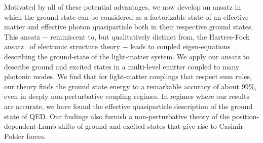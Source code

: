 \documentclass[aps,prl,twocolumn,
	groupedaddress,superscriptaddress,
	amsfonts,amssymb,amsmath,floatfix,
	citeautoscript]{revtex4-1}
\newcommand{\Jadd}[1]{\textcolor{blue}{#1}}
\begin{document}
Motivated by all of these potential advantages, we now develop an ansatz in which the ground state can be considered as a factorizable state of an effective matter and effective photon quasiparticle both in their respective ground states. This ansatz $-$ reminiscent to, but qualitatively distinct from, the Hartree-Fock ansatz~\cite{szabo1989} of electronic structure theory $-$ leads to coupled eigen-equations describing the ground-state of the light-matter system. We apply our ansatz to describe ground and excited states in a multi-level emitter coupled to many photonic modes. We find that for light-matter couplings that respect sum rules, our theory finds the ground state energy to a remarkable accuracy of about 99\%, even in deeply non-perturbative coupling regimes.  In regimes where our results are accurate, we have found the effective quasiparticle description of the ground state of QED.  Our findings also furnish a non-perturbative theory of the position-dependent Lamb shifts of ground and excited states that give rise to Casimir-Polder forces.


\end{document}
